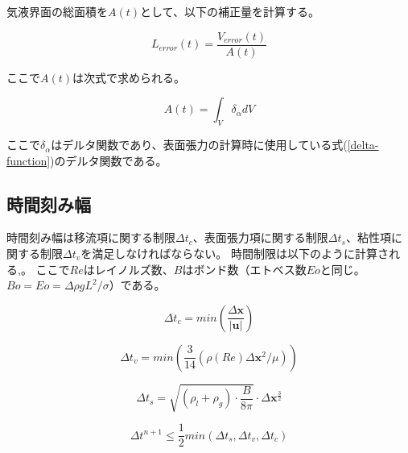 気液界面の総面積を$A(t)$として、以下の補正量を計算する。

\begin{equation}
	L_{error} (t) = \frac{V_{error}(t)}{A(t)}
\end{equation}

ここで$A(t)$は次式で求められる。

\begin{equation}
	A(t) = \int_{V} \delta_{\alpha} dV
\end{equation}

ここで$\delta_{\alpha}$はデルタ関数であり、表面張力の計算時に使用している式(\ref{delta-function})のデルタ関数である。



\subsection{時間刻み幅}
時間刻み幅は移流項に関する制限$\Delta t_{c}$、表面張力項に関する制限$\Delta t_{s}$、粘性項に関する制限$\Delta t_{v}$を満足しなければならない。
時間制限は以下のように計算される\cite{Tsubogo2003},\cite{Sussman1994}。
ここで$Re$はレイノルズ数、$B$はボンド数（エトベス数$Eo$と同じ。$Bo=Eo=\Delta \rho g L^2/\sigma$）である。

\begin{equation}
	\Delta t_{c} = min( \frac{\Delta \bm{x}}{|\bm{u}|})
\end{equation}

\begin{equation}
	\Delta t_{v} = min( \frac{3}{14}(\rho(Re) \Delta \bm{x}^2 / \mu))
\end{equation}

\begin{equation}
	\Delta t_{s} = \sqrt{(\rho_{l} + \rho_{g}) \cdot \frac{B}{8 \pi}} \cdot \Delta \bm{x}^{\frac{3}{2}}
\end{equation}

\begin{equation}
	\Delta t^{n+1} \leq \frac{1}{2} min( \Delta t_{s}, \Delta t_{v}, \Delta t_{c})
\end{equation}